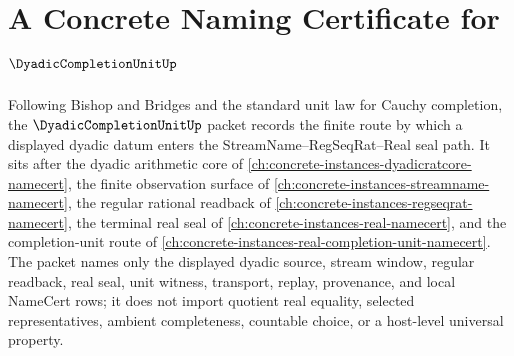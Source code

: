\chapter{A Concrete Naming Certificate for $\DyadicCompletionUnitUp$}
\label{ch:concrete-instances-dyadic-completion-unit-namecert}

Following Bishop and Bridges and the standard unit law for Cauchy completion, the $\DyadicCompletionUnitUp$ packet records the finite route by which a displayed dyadic datum enters the StreamName--RegSeqRat--Real seal path. It sits after the dyadic arithmetic core of \autoref{ch:concrete-instances-dyadicratcore-namecert}, the finite observation surface of \autoref{ch:concrete-instances-streamname-namecert}, the regular rational readback of \autoref{ch:concrete-instances-regseqrat-namecert}, the terminal real seal of \autoref{ch:concrete-instances-real-namecert}, and the completion-unit route of \autoref{ch:concrete-instances-real-completion-unit-namecert}. The packet names only the displayed dyadic source, stream window, regular readback, real seal, unit witness, transport, replay, provenance, and local NameCert rows; it does not import quotient real equality, selected representatives, ambient completeness, countable choice, or a host-level universal property.

